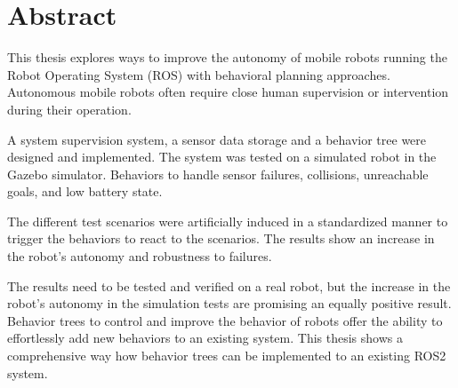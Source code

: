 \chapter*{Abstract}

This thesis explores ways to improve the autonomy of mobile robots running the Robot Operating System (ROS) with behavioral planning approaches. Autonomous mobile robots often require close human supervision or intervention during their operation. 


A system supervision system, a sensor data storage and a behavior tree were designed and implemented. The system was tested on a simulated robot in the Gazebo simulator. Behaviors to handle sensor failures, collisions, unreachable goals, and low battery state. 

The different test scenarios were artificially induced in a standardized manner to trigger the behaviors to react to the scenarios. The results show an increase in the robot's autonomy and robustness to failures.

The results need to be tested and verified on a real robot, but the increase in the robot's autonomy in the simulation tests are promising an equally positive result. Behavior trees to control and improve the behavior of robots offer the ability to effortlessly add new behaviors to an existing system. This thesis shows a comprehensive way how behavior trees can be implemented to an existing ROS2 system.